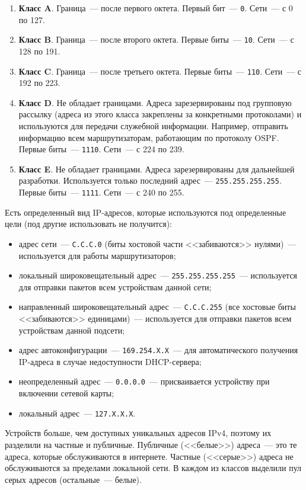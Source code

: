 \begin{enumerate}
    \item \textbf{Класс A}. Граница~--- после первого октета. Первый бит~--- \texttt{0}. Сети~--- с 0 по 127.
    \item \textbf{Класс B}. Граница~--- после второго октета. Первые биты~--- \texttt{10}. Сети~--- с 128 по 191.
    \item \textbf{Класс C}. Граница~--- после третьего октета. Первые биты~--- \texttt{110}. Сети~--- с 192 по 223.
    \item \textbf{Класс D}. Не обладает границами. Адреса зарезервированы под групповую рассылку
          (адреса из этого класса закреплены за конкретными протоколами) и используются
          для передачи служебной информации. Например, отправить информацию всем маршрутизаторам,
          работающим по протоколу OSPF. Первые биты~--- \texttt{1110}. Сети~--- с 224 по 239.
    \item \textbf{Класс E}. Не обладает границами. Адреса зарезервированы для дальнейшей разработки. Используется только последний адрес~--- \texttt{255.255.255.255}. Первые биты~--- \texttt{1111}. Сети~--- с 240 по 255.
\end{enumerate}

Есть определенный вид IP-адресов, которые используются под определенные цели (под другие использовать не получится):

\begin{itemize}
    \item адрес сети~--- \texttt{С.С.С.0} (биты хостовой части <<забиваются>> нулями)~--- используется для работы маршрутизаторов;
    \item локальный широковещательный адрес~--- \texttt{255.255.255.255}~--- используется для отправки пакетов всем устройствам данной сети;
    \item направленный широковещательный адрес~--- \texttt{С.С.С.255} (все хостовые биты <<забиваются>> единицами)~--- используется для отправки пакетов всем устройствам данной подсети;
    \item адрес автоконфигурации~--- \texttt{169.254.X.X}~--- для автоматического получения IP-адреса в случае недоступности DHCP-сервера;
    \item неопределенный адрес~--- \texttt{0.0.0.0}~--- присваивается устройству при включении сетевой карты;
    \item локальный адрес~--- \texttt{127.X.X.X}.
\end{itemize}

Устройств больше, чем доступных уникальных адресов IPv4, поэтому их разделили на частные и публичные. Публичные (<<белые>>) адреса~--- это те адреса, которые обслуживаются в интернете. Частные (<<серые>>) адреса не обслуживаются за пределами локальной сети. В каждом из классов выделили пул серых адресов (остальные~--- белые).

